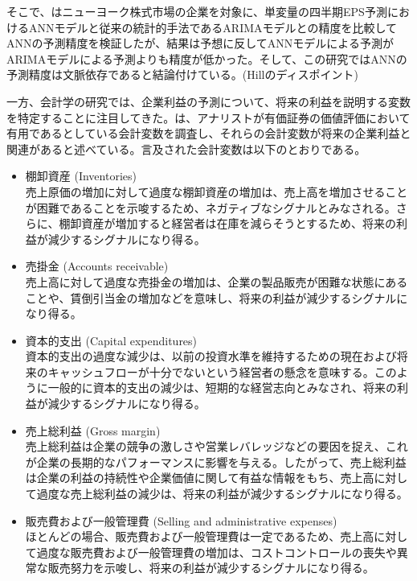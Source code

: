 \documentclass[a4paper, 12pt]{jsreport}
\begin{document}
そこで、\cite{callen1996neural}はニューヨーク株式市場の企業を対象に、単変量の四半期EPS予測におけるANNモデルと従来の統計的手法であるARIMAモデルとの精度を比較してANNの予測精度を検証したが、結果は予想に反してANNモデルによる予測がARIMAモデルによる予測よりも精度が低かった。そして、この研究ではANNの予測精度は文脈依存であると結論付けている。(Hillのディスポイント)

一方、会計学の研究では、企業利益の予測について、将来の利益を説明する変数を特定することに注目してきた。\cite*{lev1993fundamental}は、アナリストが有価証券の価値評価において有用であるとしている会計変数を調査し、それらの会計変数が将来の企業利益と関連があると述べている。言及された会計変数は以下のとおりである。

\begin{itemize}
\item 棚卸資産 (Inventories) \\
    売上原価の増加に対して過度な棚卸資産の増加は、売上高を増加させることが困難であることを示唆するため、ネガティブなシグナルとみなされる。さらに、棚卸資産が増加すると経営者は在庫を減らそうとするため、将来の利益が減少するシグナルになり得る。

\item 売掛金 (Accounts receivable) \\
    売上高に対して過度な売掛金の増加は、企業の製品販売が困難な状態にあることや、賃倒引当金の増加などを意味し、将来の利益が減少するシグナルになり得る。

\item 資本的支出 (Capital expenditures) \\
    資本的支出の過度な減少は、以前の投資水準を維持するための現在および将来のキャッシュフローが十分でないという経営者の懸念を意味する。このように一般的に資本的支出の減少は、短期的な経営志向とみなされ、将来の利益が減少するシグナルになり得る。

\item 売上総利益 (Gross margin) \\
    売上総利益は企業の競争の激しさや営業レバレッジなどの要因を捉え、これが企業の長期的なパフォーマンスに影響を与える。したがって、売上総利益は企業の利益の持続性や企業価値に関して有益な情報をもち、売上高に対して過度な売上総利益の減少は、将来の利益が減少するシグナルになり得る。

\item 販売費および一般管理費 (Selling and administrative expenses) \\
    ほとんどの場合、販売費および一般管理費は一定であるため、売上高に対して過度な販売費および一般管理費の増加は、コストコントロールの喪失や異常な販売努力を示唆し、将来の利益が減少するシグナルになり得る。


\end{itemize}
\end{document}
